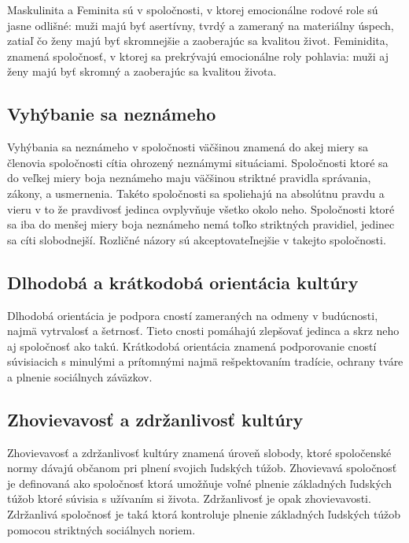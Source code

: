 \documentclass[10pt,oneside,slovak,a4paper]{article}
\begin{document}
Maskulinita a Feminita sú v spoločnosti, v ktorej emocionálne rodové role sú jasne odlišné: 
muži majú byť asertívny, tvrdý a zameraný na materiálny úspech, zatiaľ čo ženy majú
byť skromnejšie a zaoberajúc sa kvalitou život. Feminidita, znamená spoločnosť, v ktorej
sa prekrývajú emocionálne roly pohlavia: muži aj ženy majú byť skromný a zaoberajúc
sa kvalitou života.

\subsection{Vyhýbanie sa neznámeho}\label{kultura:vyhybanie}

Vyhýbania sa neznámeho v spoločnosti väčšinou znamená do akej miery sa členovia spoločnosti
cítia ohrozený neznámymi situáciami. Spoločnosti ktoré sa do veľkej miery boja neznámeho
maju väčšinou striktné pravidla správania, zákony, a usmernenia. Takéto spoločnosti sa spoliehajú
na absolútnu pravdu a vieru v to že pravdivosť jedinca ovplyvňuje všetko okolo neho. Spoločnosti
ktoré sa iba do menšej miery boja neznámeho nemá toľko striktných pravidiel, jedinec sa cíti
slobodnejší. Rozličné názory sú akceptovateľnejšie v takejto spoločnosti.

\subsection{Dlhodobá a krátkodobá orientácia kultúry}\label{kultura:cnosti}

Dlhodobá orientácia je podpora cností zameraných na odmeny v budúcnosti, najmä vytrvalosť a šetrnosť.
Tieto cnosti pomáhajú zlepšovať jedinca a skrz neho aj spoločnosť ako takú. Krátkodobá orientácia
znamená podporovanie cností súvisiacich s minulými a prítomnými najmä rešpektovaním tradície, ochrany
tváre a plnenie sociálnych záväzkov.

\subsection{Zhovievavosť a zdržanlivosť kultúry}\label{kultura:obmedzenia}

Zhovievavosť a zdržanlivosť kultúry znamená úroveň slobody, ktoré spoločenské normy
dávajú občanom pri plnení svojich ľudských túžob. Zhovievavá spoločnosť je definovaná
ako spoločnosť ktorá umožňuje voľné plnenie základných ľudských túžob ktoré súvisia s
užívaním si života. Zdržanlivosť je opak zhovievavosti. Zdržanlivá spoločnosť je taká
ktorá kontroluje plnenie základných ľudských túžob pomocou striktných sociálnych noriem.
\end{document}

